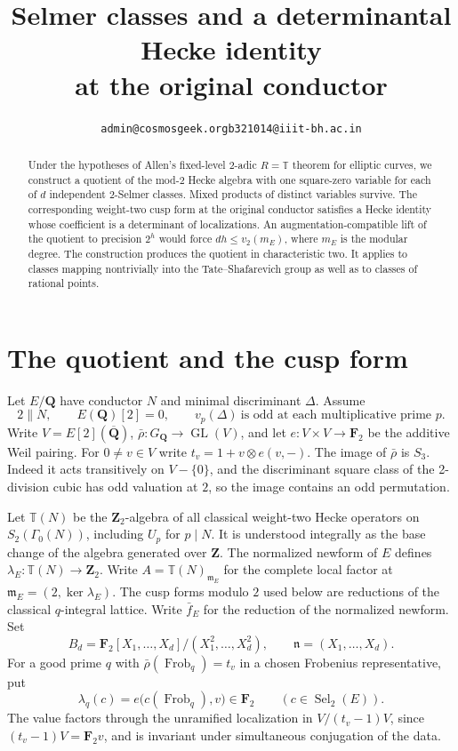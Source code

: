 \documentclass[11pt]{article}
\title{Selmer classes and a determinantal Hecke identity\\at the original conductor}
\author{\small\texttt{admin@cosmosgeek.org}\qquad\texttt{b321014@iiit-bh.ac.in}}
\date{}
\newcommand{\F}{\mathbf F_2}
\newcommand{\Q}{\mathbf Q}
\newcommand{\Z}{\mathbf Z}
\newcommand{\T}{\mathbb T}
\newcommand{\Sel}{\operatorname{Sel}}
\newcommand{\Fr}{\operatorname{Frob}}
\newcommand{\m}{\mathfrak m}
\newcommand{\n}{\mathfrak n}
\begin{document}
\maketitle
\begin{abstract}
Under the hypotheses of Allen's fixed-level \(2\)-adic \(R=\mathbb T\) theorem for elliptic curves, we construct a quotient of the mod-\(2\) Hecke algebra with one square-zero variable for each of \(d\) independent \(2\)-Selmer classes. Mixed products of distinct variables survive. The corresponding weight-two cusp form at the original conductor satisfies a Hecke identity whose coefficient is a determinant of localizations. An augmentation-compatible lift of the quotient to precision \(2^h\) would force \(dh\le v_2(m_E)\), where \(m_E\) is the modular degree. The construction produces the quotient in characteristic two. It applies to classes mapping nontrivially into the Tate--Shafarevich group as well as to classes of rational points.
\end{abstract}

\section{The quotient and the cusp form}
Let \(E/\Q\) have conductor \(N\) and minimal discriminant \(\Delta\). Assume
\[
2\parallel N,\qquad E(\Q)[2]=0,\qquad
v_p(\Delta)\ \text{is odd at each multiplicative prime }p.
\tag{H}
\]
Write \(V=E[2](\overline{\Q})\), \(\bar\rho:G_\Q\to\operatorname{GL}(V)\), and let
\(e:V\times V\to\F\) be the additive Weil pairing. For \(0\ne v\in V\) write
\(t_v=1+v\otimes e(v,-)\). The image of \(\bar\rho\) is \(S_3\). Indeed it acts transitively on \(V-\{0\}\), and the discriminant square class of the 2-division cubic has odd valuation at \(2\), so the image contains an odd permutation.

Let \(\T(N)\) be the \(\Z_2\)-algebra of all classical weight-two Hecke operators on \(S_2(\Gamma_0(N))\), including \(U_p\) for \(p\mid N\). It is understood integrally as the base change of the algebra generated over \(\Z\). The normalized newform of \(E\) defines \(\lambda_E:\T(N)\to\Z_2\). Write \(A=\T(N)_{\m_E}\) for the complete local factor at \(\m_E=(2,\ker\lambda_E)\). The cusp forms modulo \(2\) used below are reductions of the classical \(q\)-integral lattice. Write \(\bar f_E\) for the reduction of the normalized newform. Set
\[
B_d=\F[X_1,\ldots,X_d]/(X_1^2,\ldots,X_d^2),\qquad
\n=(X_1,\ldots,X_d).
\]
For a good prime \(q\) with \(\bar\rho(\Fr_q)=t_v\) in a chosen Frobenius representative, put
\[
 \lambda_q(c)=e\bigl(c(\Fr_q),v\bigr)\in\F
 \qquad(c\in\Sel_2(E)).
\tag{1}
\]
The value factors through the unramified localization in \(V/(t_v-1)V\), since \((t_v-1)V=\F v\), and is invariant under simultaneous conjugation of the data.
\end{document}
